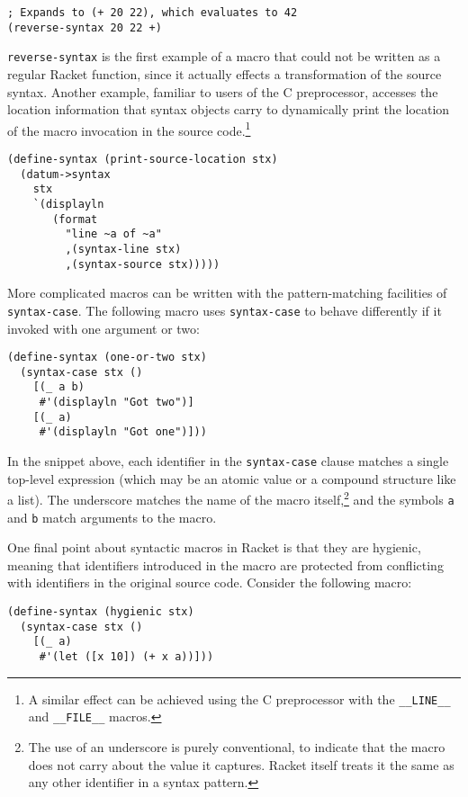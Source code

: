 \documentclass{article}
\begin{document}
\begin{lstlisting}
; Expands to (+ 20 22), which evaluates to 42
(reverse-syntax 20 22 +)
\end{lstlisting}

\texttt{reverse-syntax} is the first example of a macro that could not be written as a regular Racket function, since it actually effects a transformation of the source syntax. Another example, familiar to users of the C preprocessor, accesses the location information that syntax objects carry to dynamically print the location of the macro invocation in the source code.\footnote{A similar effect can be achieved using the C preprocessor with the \texttt{\_\_LINE\_\_} and \texttt{\_\_FILE\_\_} macros.}

\begin{lstlisting}
(define-syntax (print-source-location stx)
  (datum->syntax
    stx
    `(displayln
       (format
         "line ~a of ~a"
         ,(syntax-line stx)
         ,(syntax-source stx)))))
\end{lstlisting}

More complicated macros can be written with the pattern-matching facilities of \texttt{syntax-case}. The following macro uses \texttt{syntax-case} to behave differently if it invoked with one argument or two:

\begin{lstlisting}
(define-syntax (one-or-two stx)
  (syntax-case stx ()
    [(_ a b)
     #'(displayln "Got two")]
    [(_ a)
     #'(displayln "Got one")]))
\end{lstlisting}

In the snippet above, each identifier in the \texttt{syntax-case} clause matches a single top-level expression (which may be an atomic value or a compound structure like a list). The underscore matches the name of the macro itself,\footnote{The use of an underscore is purely conventional, to indicate that the macro does not carry about the value it captures. Racket itself treats it the same as any other identifier in a syntax pattern.} and the symbols \texttt{a} and \texttt{b} match arguments to the macro.

One final point about syntactic macros in Racket is that they are hygienic, meaning that identifiers introduced in the macro are protected from conflicting with identifiers in the original source code. Consider the following macro:

\begin{lstlisting}
(define-syntax (hygienic stx)
  (syntax-case stx ()
    [(_ a)
     #'(let ([x 10]) (+ x a))]))
\end{lstlisting}
\end{document}
